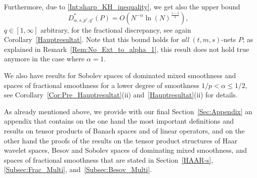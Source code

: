 \documentclass[12pt]{article}
\DeclareMathOperator{\wor}{wor}
\newcommand{\HH}{\mathcal{H}}
\begin{document}
Furthermore, due to \eqref{Int:sharp_KH_inequality}, we get also the upper bound
$$
D^*_{\alpha,s,p',q'}(P) = O \left( N^{-\alpha} \ln(N)^{\frac{s-1}{2}} \right),
$$
$q\in [1,\infty]$ arbitrary, for the fractional discrepancy, see again Corollary~\ref{Hauptresultat}. 
Note that this bound holds for \emph{all} $(t,m,s)$-nets $P$; as explained in Remark~\ref{Rem:No_Ext_to_alpha_1}, this result does not hold true anymore in the case where $\alpha = 1$.

We also have results for Sobolev spaces of dominated mixed smoothness and spaces of fractional smoothness for a lower degree of smoothness $1/p < \alpha \le 1/2$, see Corollary~\ref{Cor:Pre_Hauptresultat}(ii) 
and~\ref{Hauptresultat}(ii) for details.

As already mentioned above, we provide with our final Section~\ref{Sec:Appendix}
an appendix that contains on the one hand the most important definitions and results on tensor products of Banach spaces and of linear operators, and on the other hand the proofs of the results on the tensor product structures of Haar wavelet spaces, Besov and Sobolev spaces of dominating mixed smoothness, and spaces of fractional smoothness that are stated in Section~\ref{HAAR-s}, 
\ref{Subsec:Frac_Multi}, 
and~\ref{Subsec:Besov_Multi}. 

\end{document}
